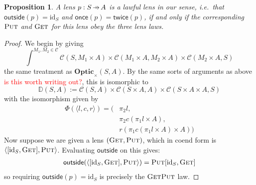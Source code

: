 \documentclass[11pt,a4paper]{article}
\theoremstyle{plain}
\newtheorem{proposition}[theorem]{Proposition}
\theoremstyle{definition}
\newcommand{\C}{\mathscr{C}}
\newcommand{\Optic}{\mathbf{Optic}}
\newcommand{\id}{\mathrm{id}}
\newcommand{\fget}{\textsc{Get}}
\newcommand{\fput}{\textsc{Put}}
\newcommand{\outside}{\mathsf{outside}}
\newcommand{\once}{\mathsf{once}}
\newcommand{\twice}{\mathsf{twice}}
\newcommand{\hto}{\ensuremath{\,\mathaccent\shortmid\rightarrow\,}}
\newcommand{\todo}[1]{\textcolor{red}{\small #1}}
\begin{document}
\begin{proposition}\label{prop-OpticImpliesLensLaws}
  A lens $p : S \hto A$ is a lawful lens in our sense, i.e.\ that $\outside(p) = \id_S$ and $\once(p) = \twice(p)$, if and only if the corresponding $\fput$ and $\fget$ for this lens obey the three lens laws.
\end{proposition}
\begin{proof}
  We begin by giving
  \[ \int^{M_1, M_2 \in \C} \C(S, M_1 \times A) \times \C(M_1 \times A, M_2 \times A) \times \C(M_2 \times A, S)\]
  the same treatment as $\Optic_\times(S, A)$. By the same sorts of arguments as above \todo{is this worth writing out?}, this is isomorphic to
  \[\mathbb{D}(S, A) := \C(S, A) \times \C(S \times A, A) \times \C(S \times A \times A, S)\]
  with the isomorphism given by
  \begin{align*}
    \Phi(\langle l, c, r \rangle) = (&\pi_2 l, \\
                                     &\pi_2 c (\pi_1 l \times A), \\
                                     &r(\pi_1 c (\pi_1 l \times A) \times A))
  \end{align*}
  Now suppose we are given a lens $(\fget, \fput)$, which in coend form is $\langle [\id_S, \fget],  \fput \rangle$. Evaluating $\outside$ on this gives:
  \begin{align*}
    \outside(\langle [\id_S, \fget],  \fput \rangle) = \fput [\id_S, \fget]
  \end{align*}
  so requiring $\outside(p) = \id_S$ is precisely the $\fget\fput$ law.


\end{proof}
\end{document}
